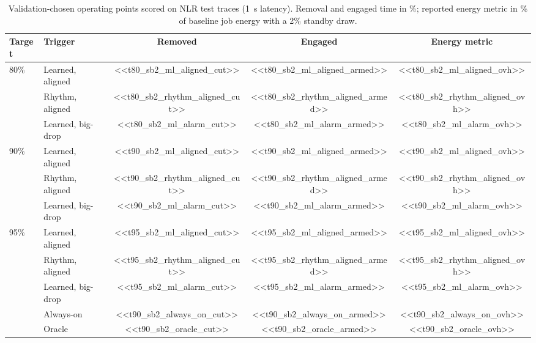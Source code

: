 \documentclass[11pt]{article}
\begin{document}
\begin{table}[t]
\centering
\caption{Validation-chosen operating points scored on NLR test traces (1~s latency). Removal and engaged
time in \%; reported energy metric in \% of baseline job energy with a 2\% standby draw.}
\label{tab:ops}
\small
\begin{tabular}{@{}llccc@{}}
\toprule
Target & Trigger & Removed & Engaged & Energy metric \\
\midrule
\multirow{3}{*}{80\%} & Learned, aligned & <<t80_sb2_ml_aligned_cut>> & <<t80_sb2_ml_aligned_armed>> & <<t80_sb2_ml_aligned_ovh>> \\
 & Rhythm, aligned & <<t80_sb2_rhythm_aligned_cut>> & <<t80_sb2_rhythm_aligned_armed>> & <<t80_sb2_rhythm_aligned_ovh>> \\
 & Learned, big-drop & <<t80_sb2_ml_alarm_cut>> & <<t80_sb2_ml_alarm_armed>> & <<t80_sb2_ml_alarm_ovh>> \\
\midrule
\multirow{3}{*}{90\%} & Learned, aligned & <<t90_sb2_ml_aligned_cut>> & <<t90_sb2_ml_aligned_armed>> & <<t90_sb2_ml_aligned_ovh>> \\
 & Rhythm, aligned & <<t90_sb2_rhythm_aligned_cut>> & <<t90_sb2_rhythm_aligned_armed>> & <<t90_sb2_rhythm_aligned_ovh>> \\
 & Learned, big-drop & <<t90_sb2_ml_alarm_cut>> & <<t90_sb2_ml_alarm_armed>> & <<t90_sb2_ml_alarm_ovh>> \\
\midrule
\multirow{3}{*}{95\%} & Learned, aligned & <<t95_sb2_ml_aligned_cut>> & <<t95_sb2_ml_aligned_armed>> & <<t95_sb2_ml_aligned_ovh>> \\
 & Rhythm, aligned & <<t95_sb2_rhythm_aligned_cut>> & <<t95_sb2_rhythm_aligned_armed>> & <<t95_sb2_rhythm_aligned_ovh>> \\
 & Learned, big-drop & <<t95_sb2_ml_alarm_cut>> & <<t95_sb2_ml_alarm_armed>> & <<t95_sb2_ml_alarm_ovh>> \\
\midrule
 & Always-on & <<t90_sb2_always_on_cut>> & <<t90_sb2_always_on_armed>> & <<t90_sb2_always_on_ovh>> \\
 & Oracle & <<t90_sb2_oracle_cut>> & <<t90_sb2_oracle_armed>> & <<t90_sb2_oracle_ovh>> \\
\bottomrule
\end{tabular}
\end{table}
\end{document}
